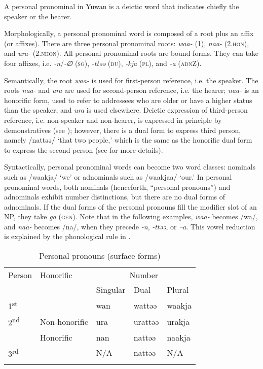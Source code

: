 A personal pronominal in Yuwan is a deictic word that indicates chiefly the speaker or the hearer.

Morphologically, a personal pronominal word is composed of a root plus an affix (or affixes). There are three personal pronominal roots: \textit{waa-} (1), \textit{naa-} (2.\textsc{hon}), and \textit{ura-} (2.\textsc{nhon}). All personal pronominal roots are bound forms. They can take four affixes, i.e. \textit{{}-n}/\textit{{}-∅} (\textsc{sg}), \textit{{}-ttəə} (\textsc{du}), \textit{{}-kja} (\textsc{pl}), and \textit{{}-a} (\textsc{adn}Z).

Semantically, the root \textit{waa-} is used for first-person reference, i.e. the speaker. The roots \textit{naa-} and \textit{ura} are used for second-person reference, i.e. the hearer; \textit{naa-} is an honorific form, used to refer to addressees who are older or have a higher status than the speaker, and \textit{ura} is used elsewhere. Deictic expression of third-person reference, i.e. non-speaker and non-hearer, is expressed in principle by demonstratives (see ); however, there is a dual form to express third person, namely /nattəə/ ‘that two people,’ which is the same as the honorific dual form to express the second person (see  for more details).

Syntactically, personal pronominal words can become two word classes: nominals such as /waakja/ ‘we’ or adnominals such as /waakjaa/ ‘our.’ In personal pronominal words, both nominals (henceforth, “personal pronouns”) and adnominals exhibit number distinctions, but there are no dual forms of adnominals. If the dual forms of the personal pronouns fill the modifier slot of an NP, they take \textit{ga} (\textsc{gen}). Note that in the following examples, \textit{waa-} becomes /wa/, and \textit{naa-} becomes /na/, when they precede \textit{{}-n}, \textit{{}-ttəə}, or \textit{–a}. This vowel reduction is explained by the phonological rule in .

\begin{table}
\caption{\label{tab:key:31}Personal pronouns (surface forms)}
\begin{tabular}{lllll}
\lsptoprule
Person & Honorific & \multicolumn{3}{c}{Number}\\\cmidrule(lr){3-5}
       &           &  Singular & Dual & Plural\\\midrule
1\textsuperscript{st}  &                & wan   & wattəə  & waakja\\
2\textsuperscript{nd}  &  Non-honorific & ura   & urattəə & urakja\\
                       &  Honorific     & nan   & nattəə  & naakja\\
3\textsuperscript{rd}  &                & N/A   & nattəə  & N/A   \\
\lspbottomrule
\end{tabular}
\end{table}

